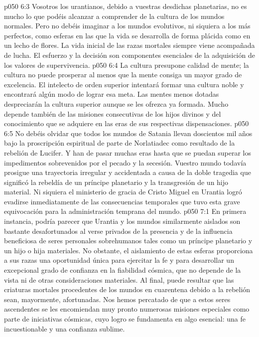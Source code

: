 \vs p050 6:3 Vosotros los urantianos, debido a vuestras desdichas planetarias, no es mucho lo que podéis alcanzar a comprender de la cultura de los mundos normales. Pero no debéis imaginar a los mundos evolutivos, ni siquiera a los más perfectos, como esferas en las que la vida se desarrolla de forma plácida como en un lecho de flores. La vida inicial de las razas mortales siempre viene acompañada de lucha. El esfuerzo y la decisión son componentes esenciales de la adquisición de los valores de supervivencia.
\vs p050 6:4 La cultura presupone calidad de mente; la cultura no puede prosperar al menos que la mente consiga un mayor grado de excelencia. El intelecto de orden superior intentará formar una cultura noble y encontrará algún modo de lograr esa meta. Las mentes menos dotadas despreciarán la cultura superior aunque se les ofrezca ya formada. Mucho depende también de las misiones consecutivas de los hijos divinos y del conocimiento que se adquiere en las eras de sus respectivas dispensaciones.
\vs p050 6:5 \pc No debéis olvidar que todos los mundos de Satania llevan doscientos mil años bajo la proscripción espiritual de parte de Norlatiadec como resultado de la rebelión de Lucifer. Y han de pasar muchas eras hasta que se puedan superar los impedimentos sobrevenidos por el pecado y la secesión. Vuestro mundo todavía prosigue una trayectoria irregular y accidentada a causa de la doble tragedia que significó la rebeldía de un príncipe planetario y la transgresión de un hijo material. Ni siquiera el ministerio de gracia de Cristo Miguel en Urantia logró evadirse inmediatamente de las consecuencias temporales que tuvo esta grave equivocación para la administración temprana del mundo.
\vs p050 7:1 En primera instancia, podría parecer que Urantia y los mundos similarmente aislados son bastante desafortunados al verse privados de la presencia y de la influencia beneficiosa de seres personales sobrehumanos tales como un príncipe planetario y un hijo o hija materiales. No obstante, el aislamiento de estas esferas proporciona a sus razas una oportunidad única para ejercitar la fe y para desarrollar un excepcional grado de confianza en la fiabilidad cósmica, que no depende de la vista ni de otras consideraciones materiales. Al final, puede resultar que las criaturas mortales procedentes de los mundos en cuarentena debido a la rebelión sean, mayormente, afortunadas. Nos hemos percatado de que a estos seres ascendentes se les encomiendan muy pronto numerosas misiones especiales como parte de iniciativas cósmicas, cuyo logro se fundamenta en algo esencial: una fe incuestionable y una confianza sublime.
